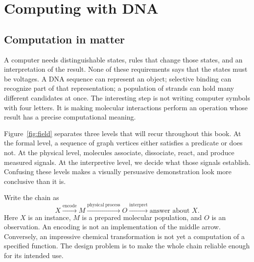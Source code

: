 \chapter{Computing with DNA}\label{ch:computing}

\section{Computation in matter}\label{sec:matter}
A computer needs distinguishable states, rules that change those states, and an interpretation of the result. None of these requirements says that the states must be voltages. A DNA sequence can represent an object; selective binding can recognize part of that representation; a population of strands can hold many different candidates at once. The interesting step is not writing computer symbols with four letters. It is making molecular interactions perform an operation whose result has a precise computational meaning.

Figure~\ref{fig:field} separates three levels that will recur throughout this book. At the formal level, a sequence of graph vertices either satisfies a predicate or does not. At the physical level, molecules associate, dissociate, react, and produce measured signals. At the interpretive level, we decide what those signals establish. Confusing these levels makes a visually persuasive demonstration look more conclusive than it is.

Write the chain as
\[
 X\xrightarrow{\mathrm{encode}}M
 \xrightarrow{\mathrm{physical\ process}}O
 \xrightarrow{\mathrm{interpret}}\text{answer about }X.
\]
Here $X$ is an instance, $M$ is a prepared molecular population, and $O$ is an observation. An encoding is not an implementation of the middle arrow. Conversely, an impressive chemical transformation is not yet a computation of a specified function. The design problem is to make the whole chain reliable enough for its intended use.

